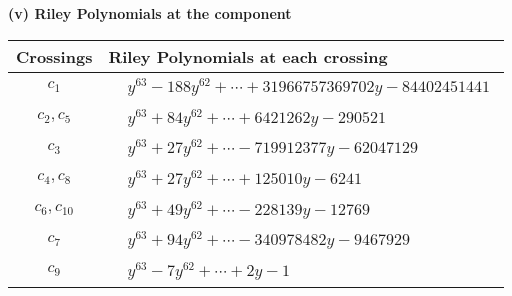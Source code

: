 \documentclass[1p]{elsarticle_modified}
\theoremstyle{definition}
\begin{document}
\newpage\renewcommand{\arraystretch}{1}
\flushleft \textbf{(v) Riley Polynomials at the component}\newline \\
\begin{tabular}{m{50pt}|m{274pt}}
Crossings & \hspace{64pt}Riley Polynomials at each crossing \\
\hline $$\begin{aligned}c_{1}\end{aligned}$$&$\begin{aligned}
&y^{63}-188 y^{62}+\cdots+31966757369702 y-84402451441
\end{aligned}$\\
\hline $$\begin{aligned}c_{2},c_{5}\end{aligned}$$&$\begin{aligned}
&y^{63}+84 y^{62}+\cdots+6421262 y-290521
\end{aligned}$\\
\hline $$\begin{aligned}c_{3}\end{aligned}$$&$\begin{aligned}
&y^{63}+27 y^{62}+\cdots-719912377 y-62047129
\end{aligned}$\\
\hline $$\begin{aligned}c_{4},c_{8}\end{aligned}$$&$\begin{aligned}
&y^{63}+27 y^{62}+\cdots+125010 y-6241
\end{aligned}$\\
\hline $$\begin{aligned}c_{6},c_{10}\end{aligned}$$&$\begin{aligned}
&y^{63}+49 y^{62}+\cdots-228139 y-12769
\end{aligned}$\\
\hline $$\begin{aligned}c_{7}\end{aligned}$$&$\begin{aligned}
&y^{63}+94 y^{62}+\cdots-340978482 y-9467929
\end{aligned}$\\
\hline $$\begin{aligned}c_{9}\end{aligned}$$&$\begin{aligned}
&y^{63}-7 y^{62}+\cdots+2 y-1
\end{aligned}$\\

\end{tabular}
\end{document}
